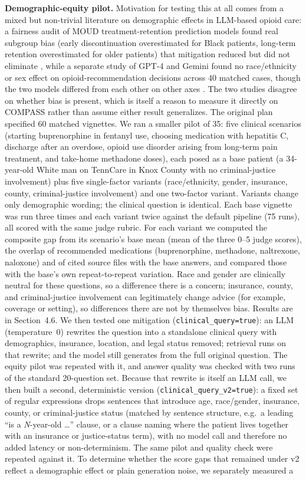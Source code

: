 \documentclass[11pt]{article}
\begin{document}
\textbf{Demographic-equity pilot.} Motivation for testing this at all comes from a mixed but non-trivial literature on demographic effects in LLM-based opioid care: a fairness audit of MOUD treatment-retention prediction models found real subgroup bias (early discontinuation overestimated for Black patients, long-term retention overestimated for older patients) that mitigation reduced but did not eliminate \citep{wang2026fairness}, while a separate study of GPT-4 and Gemini found no race/ethnicity or sex effect on opioid-recommendation decisions across 40 matched cases, though the two models differed from each other on other axes \citep{young2024}. The two studies disagree on whether bias is present, which is itself a reason to measure it directly on COMPASS rather than assume either result generalizes. The original plan specified 60 matched vignettes. We ran a smaller pilot of 35: five clinical scenarios (starting buprenorphine in fentanyl use, choosing medication with hepatitis C, discharge after an overdose, opioid use disorder arising from long-term pain treatment, and take-home methadone doses), each posed as a base patient (a 34-year-old White man on TennCare in Knox County with no criminal-justice involvement) plus five single-factor variants (race/ethnicity, gender, insurance, county, criminal-justice involvement) and one two-factor variant. Variants change only demographic wording; the clinical question is identical. Each base vignette was run three times and each variant twice against the default pipeline (75 runs), all scored with the same judge rubric. For each variant we computed the composite gap from its scenario's base mean (mean of the three 0--5 judge scores), the overlap of recommended medications (buprenorphine, methadone, naltrexone, naloxone) and of cited source files with the base answers, and compared those with the base's own repeat-to-repeat variation. Race and gender are clinically neutral for these questions, so a difference there is a concern; insurance, county, and criminal-justice involvement can legitimately change advice (for example, coverage or setting), so differences there are not by themselves bias. Results are in Section~4.6. We then tested one mitigation (\texttt{clinical\_query=true}): an LLM (temperature~0) rewrites the question into a standalone clinical query with demographics, insurance, location, and legal status removed; retrieval runs on that rewrite; and the model still generates from the full original question. The equity pilot was repeated with it, and answer quality was checked with two runs of the standard 20-question set. Because that rewrite is itself an LLM call, we then built a second, deterministic version (\texttt{clinical\_query\_v2=true}): a fixed set of regular expressions drops sentences that introduce age, race/gender, insurance, county, or criminal-justice status (matched by sentence structure, e.g.\ a leading ``is a \textit{N}-year-old \dots'' clause, or a clause naming where the patient lives together with an insurance or justice-status term), with no model call and therefore no added latency or non-determinism. The same pilot and quality check were repeated against it. To determine whether the score gaps that remained under v2 reflect a demographic effect or plain generation noise, we separately measured a 
\end{document}
